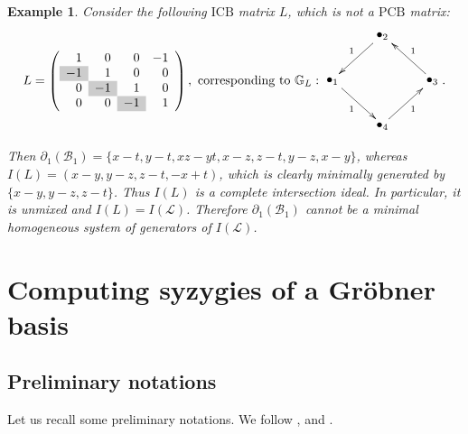 \documentclass[10pt]{amsart}
\newcommand{\y}{\cellcolor{gray!40}}
\newcommand{\mbg}{\mbox{$\mathbb{G}$}}
\newcommand{\mcb}{\mbox{$\mathcal{B}$}}
\newcommand{\mcl}{\mbox{$\mathcal{L}$}}
\newcommand{\icb}{\mbox{$\mathrm{ICB}$}}
\newcommand{\pcb}{\mbox{$\mathrm{PCB}$}}
\newcommand{\dif}{\mbox{$\partial$}}
\newtheorem{example}[cdrthm]{Example}
\theoremstyle{definition}
\theoremstyle{remark}
\begin{document}
\begin{example}
Consider the following $\icb$ matrix $L$, which is not a $\pcb$
matrix:
\begin{eqnarray*}
L=\left(\begin{array}{rrrr}
1&0&0&-1\\\y-1&1&0&0\\0&\y-1&1&0\\0&0&\y-1&1
\end{array}\right), \mbox{ corresponding to }\mbg_{L}:
\vcenter{\xymatrix{ & \bullet_2 \ar[dl]_1 & \\ \bullet_1 \ar[dr]_1 & &
    \bullet_3 \ar[ul]_1\\ & \bullet_4 \ar[ur]_1}}.
\end{eqnarray*}

Then $\dif_1(\mcb_1)=\{x-t,y-t,xz-yt,x-z,z-t,y-z,x-y\}$, whereas
$I(L)=(x-y,y-z,z-t,-x+t)$, which is clearly minimally generated by
$\{x-y,y-z,z-t\}$. Thus $I(L)$ is a complete intersection ideal. In
particular, it is unmixed and $I(L)=I(\mcl)$. Therefore
$\dif_1(\mcb_1)$ cannot be a minimal homogeneous system of generators
of $I(\mcl)$.
\end{example}

\section{Computing syzygies of a Gr\"obner basis}

\subsection{Preliminary notations}

 Let us recall some preliminary notations. We follow
\cite[Section~2]{emss}, \cite{bs} and \cite[\S~15]{eisenbud}.
\end{document}

